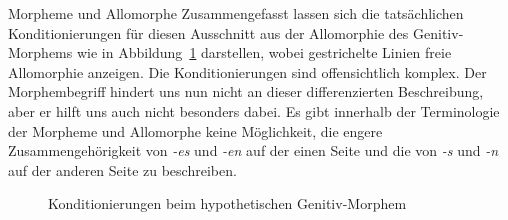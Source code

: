 \begin{Vertiefung}{Morpheme und Allomorphe}
Zusammengefasst lassen sich die tatsächlichen Konditionierungen für diesen Ausschnitt aus der Allomorphie des Genitiv-Morphems wie in Abbildung~\ref{fig:kondgensg} darstellen, wobei gestrichelte Linien freie Allomorphie anzeigen.
Die Konditionierungen sind offensichtlich komplex.
Der Morphembegriff hindert uns nun nicht an dieser differenzierten Beschreibung, aber er hilft uns auch nicht besonders dabei.
Es gibt innerhalb der Terminologie der Morpheme und Allomorphe keine Möglichkeit, die engere Zusammengehörigkeit von \textit{-es} und \textit{-en} auf der einen Seite und die von \textit{-s} und \textit{-n} auf der anderen Seite zu beschreiben.

\begin{figure}[!htbp]
  \centering
  \caption{Konditionierungen beim hypothetischen Genitiv-Morphem}
  \label{fig:kondgensg}
\end{figure}


\end{Vertiefung}
